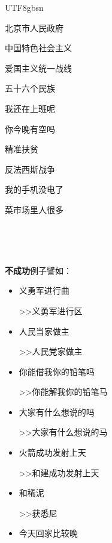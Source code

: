 \documentclass{article}
\newcommand{\tmstrong}[1]{\textbf{#1}}
\newenvironment{itemizedot}{\begin{itemize} \renewcommand{\labelitemi}{$\bullet$}\renewcommand{\labelitemii}{$\bullet$}\renewcommand{\labelitemiii}{$\bullet$}\renewcommand{\labelitemiv}{$\bullet$}}{\end{itemize}}
\newenvironment{tmindent}{\begin{tmparmod}{1.5em}{0pt}{0pt}}{\end{tmparmod}}
\newenvironment{tmparmod}[3]{\begin{list}{}{\setlength{\topsep}{0pt}\setlength{\leftmargin}{#1}\setlength{\rightmargin}{#2}\setlength{\parindent}{#3}\setlength{\listparindent}{\parindent}\setlength{\itemindent}{\parindent}\setlength{\parsep}{\parskip}} \item[]}{\end{list}}
\begin{document}
\begin{CJK*}{UTF8}{gbsn}
\begin{tmindent}
\begin{tmbothlined}
    \item 北京市人民政府
    
    \item 中国特色社会主义
    
    \item 爱国主义统一战线
    
    \item 五十六个民族
    
    \item 我还在上班呢
    
    \item 你今晚有空吗
    
    \item 精准扶贫
    
    \item 反法西斯战争
    
    \item 我的手机没电了
    
    \item 菜市场里人很多
  \end{tmbothlined}
  
  \
  
  \
  
  {\tmstrong{不成功}}例子譬如：
  
  \begin{tmbothlined}
    \begin{itemizedot}
      \item 义勇军进行曲
      
      >>义勇军进行区
      
      \item 人民当家做主
      
      >>人民党家做主
      
      \item 你能借我你的铅笔吗
      
      >>你能解我你的铅笔马
      
      \item 大家有什么想说的吗
      
      >>大家有什么想说的马
      
      \item 火箭成功发射上天
      
      >>和建成功发射上天
      
      \item 和稀泥
      
      >>获悉尼
      
      \item 今天回家比较晚
      

\end{itemizedot}
\end{tmbothlined}
\end{tmindent}
\end{CJK*}
\end{document}
